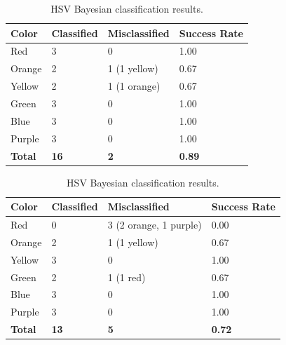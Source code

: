 \documentclass[twoside]{IEEEtran}
\begin{document}
\begin{table}[!t]
    \begin{minipage}{\columnwidth}
        \centering
        \caption{RGB Bayesian classification results.}%
        \label{rgb_bayes}
        \begin{tabular}{ l l l l }
            \toprule
            \bfseries Color & \bfseries Classified & \bfseries Misclassified & \bfseries Success Rate \\
            \midrule
            Red             & 3                    & 0                       & 1.00                   \\
            Orange          & 2                    & 1 (1 yellow)            & 0.67                   \\
            Yellow          & 2                    & 1 (1 orange)            & 0.67                   \\
            Green           & 3                    & 0                       & 1.00                   \\
            Blue            & 3                    & 0                       & 1.00                   \\
            Purple          & 3                    & 0                       & 1.00                   \\
            \midrule
            \bfseries Total & \bfseries 16         & \bfseries 2             & \bfseries 0.89         \\
            \bottomrule
        \end{tabular}
    \end{minipage}%
    \begin{minipage}{\columnwidth}
        \centering
        \caption{HSV Bayesian classification results.}%
        \label{hsv_bayes}
        \begin{tabular}{ l l l l }
            \toprule
            \bfseries Color & \bfseries Classified & \bfseries Misclassified & \bfseries Success Rate \\
            \midrule
            Red             & 0                    & 3 (2 orange, 1 purple)  & 0.00                   \\
            Orange          & 2                    & 1 (1 yellow)            & 0.67                   \\
            Yellow          & 3                    & 0                       & 1.00                   \\
            Green           & 2                    & 1 (1 red)               & 0.67                   \\
            Blue            & 3                    & 0                       & 1.00                   \\
            Purple          & 3                    & 0                       & 1.00                   \\
            \midrule
            \bfseries Total & \bfseries 13         & \bfseries 5             & \bfseries 0.72         \\
            \bottomrule
        \end{tabular}
    \end{minipage}
\end{table}
\end{document}
